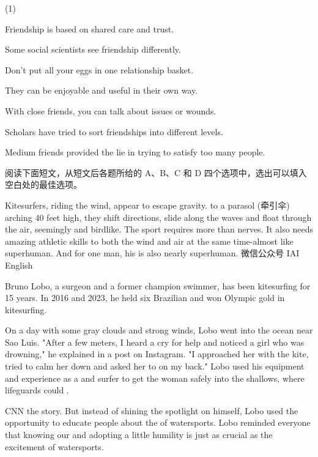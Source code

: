 \documentclass{英语试卷}
\begin{document}
\begin{choices}(1)
  \item Friendship is based on shared care and trust.
  \item Some social scientists see friendship differently.
  \item Don't put all your eggs in one relationship basket.
  \item They can be enjoyable and useful in their own way.
  \item With close friends, you can talk about issues or wounds.
  \item Scholars have tried to sort friendships into different levels.
  \item Medium friends provided the lie in trying to satisfy too many people.
\end{choices}
\par 阅读下面短文，从短文后各题所给的 A、B、C 和 D 四个选项中，选出可以填入空白处的最佳选项。\par
\par Kitesurfers, riding the wind, appear to escape gravity.  to a parasol (牵引伞) arching 40 feet high, they shift directions, slide along the waves and float through the air, seemingly  and birdlike. The sport requires more than  nerves. It also needs amazing athletic skills to  both the wind and air at the same time-almost like superhuman. And for one man, his  is also nearly superhuman. 微信公众号 IAI English\par
\par Bruno Lobo, a surgeon and a former champion swimmer, has been kitesurfing for 15 years. In 2016 and 2023, he held six Brazilian  and won Olympic gold in kitesurfing.\par
\par On a  day with some gray clouds and strong winds, Lobo went into the ocean near Sao Luis. "After  a few meters, I heard a cry for help and noticed a girl who was drowning," he explained in a post on Instagram. "I  approached her with the kite, tried to calm her down and asked her to  on my back." Lobo used his equipment and experience as a  and surfer to get the woman safely into the shallows, where lifeguards could .\par
\par CNN  the story. But instead of shining the spotlight on himself, Lobo used the opportunity to educate people about the  of watersports. Lobo reminded everyone that knowing our  and adopting a little humility is just as crucial as the excitement of watersports.\par
\end{document}
